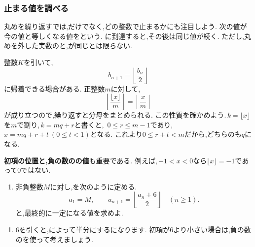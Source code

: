   \subsubsection{止まる値を調べる}\label{節：ガウス型の不動点と停止}
    丸めを繰り返すでは,だけでなく,どの整数で止まるかにも注目しよう.
    次の値が今の値と等しくなる値をという.
    に到達すると,その後は同じ値が続く.
    ただし,丸めを外した実数のと,が同じとは限らない.

    整数$K$を引いて,
    \[
      b_{n+1}=\left\lfloor\frac{b_n}{2}\right\rfloor
    \]
    に帰着できる場合がある.
    正整数$m$に対して,
    \[
      \left\lfloor\frac{\lfloor x\rfloor}{m}\right\rfloor
      =\left\lfloor\frac xm\right\rfloor
    \]
    が成り立つので,繰り返すと分母をまとめられる.
    この性質を確かめよう.\,$k=\lfloor x\rfloor$を$m$で割り,\,$k=mq+r$と書くと,
    \,$0\le r\le m-1$であり,\,$x=mq+r+t\ (0\le t<1)$となる.
    これより$0\le r+t<m$だから,どちらのも$q$になる.

    \textbf{初項の位置と,負の数のの値}も重要である.
    例えば,\,$-1<x<0$なら$\lfloor x\rfloor=-1$であって0ではない.

    \noindent {}\par\nobreak
    \begin{enumerate}[label=(\arabic*),parsep=3pt,beginpenalty=10000,format=\bookitemlink{example-gauss-role-6}{problem}{answer}]
      \item 非負整数$M$に対し,を次のように定める.
            \[
              a_1=M,\qquad
              a_{n+1}=\left\lfloor\frac{a_n+6}{2}\right\rfloor
              \quad(n\ge1).
            \]
            と,最終的に一定になる値を求めよ.
    \end{enumerate}

    \noindent {}\par\nobreak
    \begin{enumerate}[label=(\arabic*),parsep=3pt,beginpenalty=10000,format=\bookitemlink{example-gauss-role-6}{hint}{problem}]
      \item 6を引くと,によって半分にするになります.
            初項が6より小さい場合は,負の数のを使って考えましょう.
    \end{enumerate}

